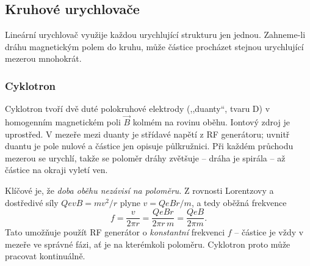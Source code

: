\subsection{Kruhové urychlovače}

Lineární urychlovač využije každou urychlující strukturu jen jednou. Zahneme-li dráhu
magnetickým polem do kruhu, může částice procházet stejnou urychlující mezerou mnohokrát.

\subsubsection{Cyklotron}

\begin{center}
\end{center}

Cyklotron tvoří dvě duté polokruhové elektrody (,,duanty``, tvaru D) v homogenním
magnetickém poli \(\vec B\) kolmém na rovinu oběhu. Iontový zdroj je uprostřed. V mezeře
mezi duanty je střídavé napětí z RF generátoru; uvnitř duantu je pole nulové a částice
jen opisuje půlkružnici. Při každém průchodu mezerou se urychlí, takže se poloměr dráhy
zvětšuje -- dráha je spirála -- až částice na okraji vyletí ven.

Klíčové je, že \emph{doba oběhu nezávisí na poloměru}. Z rovnosti Lorentzovy a dostředivé
síly \(QevB = mv^2/r\) plyne \(v = QeBr/m\), a tedy oběžná frekvence
\[
  f = \frac{v}{2\pi r} = \frac{QeBr}{2\pi r\, m} = \frac{QeB}{2\pi m} .
\]
Tato  umožňuje použít RF generátor o \emph{konstantní} frekvenci
\(f\) -- částice je vždy v mezeře ve správné fázi, ať je na kterémkoli poloměru. Cyklotron
proto může pracovat kontinuálně.


